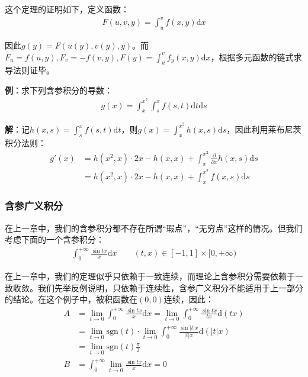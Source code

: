 \documentclass{ctexart}
\let\oldtextbf\textbf
\renewcommand{\textbf}[1]{\textcolor{brown!50!red}{\oldtextbf{#1}}}
\begin{document}
这个定理的证明如下，定义函数：
\begin{align*}
    F(u,v,y)=\int_u^v f(x,y)\mathrm{d}x
\end{align*}

因此$g(y)=F(u(y),v(y),y)$。而$F_u=f(u,y),F_v=-f(v,y),F(y)=\int_u^v f_y(x,y)\mathrm{d}x$，根据多元函数的链式求导法则证毕。

\textbf{\color{brown!50!red}例}：求下列含参积分的导数：
\begin{align*}
    g(x)=\int_x^{x^2}\int_s^xf(s,t)\mathrm{d}t\mathrm{d}s
\end{align*}

\textbf{\color{brown!50!red}解}：记$h(x,s)=\int_s^x f(s,t)\mathrm{d}t$，则$g(x)=\int_x^{x^2}h(x,s)\mathrm{d}s$，因此利用莱布尼茨积分法则：
\begin{align*}
g'(x)&=h(x^2,x)\cdot2x-h(x,x)+\int_x^{x^2}\frac{\partial }{\partial x}h(x,s)\mathrm{d}s\\
&= h(x^2,x)\cdot2x-h(x,x)+\int_x^{x^2}f(x,s)\mathrm{d}s
\end{align*}

\subsubsection{含参广义积分}
在上一章中，我们的含参积分都不存在所谓“瑕点”，“无穷点”这样的情况。但我们考虑下面的一个含参积分：
\begin{align*}
    \int_0^{+\infty}\frac{\sin tx}{x}\mathrm{d}x\qquad (t,x)\in[-1,1]\times[0,+\infty)
\end{align*}

在上一章中，我们的定理似乎只依赖于一致连续，而理论上含参积分需要依赖于一致收敛。我们先举反例说明，只依赖于连续性，含参广义积分不能适用于上一部分的结论。在这个例子中，被积函数在$(0,0)$连续，因此：
\begin{align*}
A&=\lim_{t\to 0}\int_0^{+\infty}\frac{\sin tx}{x}\mathrm{d}x=\lim_{t\to 0}
\int_0^{+\infty}\frac{\sin tx}{tx}\mathrm{d}(tx)\\
&=\lim_{t\to 0}\text{sgn}(t)\cdot\lim_{t\to 0}
\int_0^{+\infty}\frac{\sin |t|x}{|t|x}\mathrm{d}(|t|x)\\
&=\lim_{t\to 0}\text{sgn}(t)\frac{\pi}{2}\\
B&=\int_0^{+\infty}\lim_{t\to 0}\frac{\sin tx}{x}\mathrm{d}x=0
\end{align*}
\end{document}
